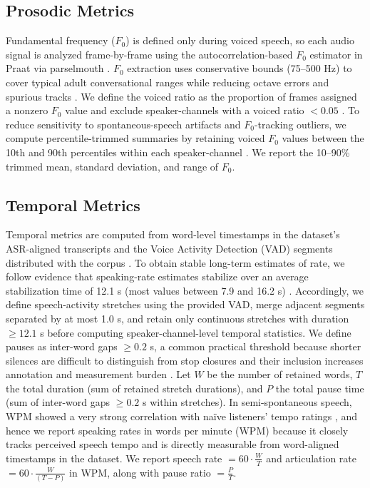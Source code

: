 \documentclass[conference]{IEEEtran}
\begin{document}
\subsection{Prosodic Metrics}
Fundamental frequency ($F_0$) is defined only during voiced speech, so each audio signal is analyzed frame-by-frame using the autocorrelation-based $F_0$ estimator in Praat via parselmouth \cite{jadoul2018introducing}. 
$F_0$ extraction uses conservative bounds (75--500 Hz) to cover typical adult conversational ranges while reducing octave errors and spurious tracks \cite{vogel2009standardization}. 
We define the voiced ratio as the proportion of frames assigned a nonzero $F_0$ value and exclude speaker-channels with a voiced ratio $<0.05$ \cite{titze_toward_1994}. 
To reduce sensitivity to spontaneous-speech artifacts and $F_0$-tracking outliers, we compute percentile-trimmed summaries by retaining voiced $F_0$ values between the 10th and 90th percentiles within each speaker-channel \cite{nguyen2024culturax}. 
We report the 10--90\% trimmed mean, standard deviation, and range of $F_0$.

\subsection{Temporal Metrics}\label{sec:temporalmetrics}
Temporal metrics are computed from word-level timestamps in the dataset's ASR-aligned transcripts and the Voice Activity Detection (VAD) segments distributed with the corpus \cite{seamless_interaction}. 
To obtain stable long-term estimates of rate, we follow evidence that speaking-rate estimates stabilize over an average stabilization time of 12.1 s (most values between 7.9 and 16.2 s) \cite{arantes2018minimum}. 
Accordingly, we define speech-activity stretches using the provided VAD, merge adjacent segments separated by at most 1.0 s, and retain only continuous stretches with duration $\geq 12.1$ s before computing speaker-channel-level temporal statistics. 
We define pauses as inter-word gaps $\geq 0.2$ s, a common practical threshold because shorter silences are difficult to distinguish from stop closures and their inclusion increases annotation and measurement burden \cite{campione2002large}. 
Let $W$ be the number of retained words, $T$ the total duration (sum of retained stretch durations), and $P$ the total pause time (sum of inter-word gaps $\geq 0.2$ s within stretches). 
In semi-spontaneous speech, WPM showed a very strong correlation with naïve listeners' tempo ratings \cite{iwarsson2023measuring}, and hence we report speaking rates in words per minute (WPM) because it closely tracks perceived speech tempo and is directly measurable from word-aligned timestamps in the dataset.
We report speech rate $=60\cdot \frac{W}{T}$ and articulation rate $=60\cdot \frac{W}{(T-P)}$ \cite{goldman1956determinants} in WPM, along with pause ratio $=\frac{P}{T}$.
\end{document}
